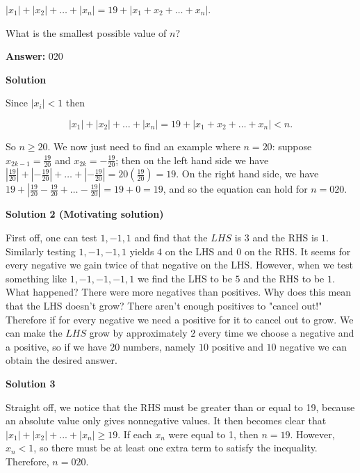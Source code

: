 \begin{enumerate}
 $|x_1| + |x_2| + \dots + |x_n| = 19 + |x_1 + x_2 + \dots + x_n|$.

 What is the smallest possible value of $n$?


 
 \textbf{Answer: }020



\textbf{Solution}

Since $|x_i| < 1$ then

 
 \[|x_1| + |x_2| + \dots + |x_n| = 19 + |x_1 + x_2 + \dots + x_n| < n.\]

 So $n \ge 20$. We now just need to find an example where $n = 20$: suppose $x_{2k-1} = \frac{19}{20}$ and $x_{2k} = -\frac{19}{20}$; then on the left hand side we have $\left|\frac{19}{20}\right| + \left|-\frac{19}{20}\right| + \dots + \left|-\frac{19}{20}\right| = 20\left(\frac{19}{20}\right) = 19$. On the right hand side, we have $19 + \left|\frac{19}{20} - \frac{19}{20} + \dots - \frac{19}{20}\right| = 19 + 0 = 19$, and so the equation can hold for $n = \boxed{020}$.

 


 



\textbf{Solution 2 (Motivating solution)}

First off, one can test $1,-1,1$ and find that the $LHS$ is $3$ and the RHS is $1.$ Similarly testing $1,-1,-1,1$ yields $4$ on the LHS and $0$ on the RHS. It seems for every negative we gain twice of that negative on the LHS. However, when we test something like $1,-1,-1,-1,1$ we find the LHS to be $5$ and the RHS to be $1.$ What happened? There were more negatives than positives. Why does this mean that the LHS doesn't grow? There aren't enough positives to "cancel out!" Therefore if for every negative we need a positive for it to cancel out to grow. We can make the $LHS$ grow by approximately $2$ every time we choose a negative and a positive, so if we have $20$ numbers, namely $10$ positive and $10$ negative we can obtain the desired answer.

 



\textbf{Solution 3}

Straight off, we notice that the RHS must be greater than or equal to 19, because an absolute value only gives nonnegative values. It then becomes clear that $|x_1|+|x_2|+...+|x_n|\ge19$. If each $x_n$ were equal to 1, then $n=19$. However, $x_n<1$, so there must be at least one extra term to satisfy the inequality. Therefore, $n=\boxed{020}$.


\end{enumerate}
